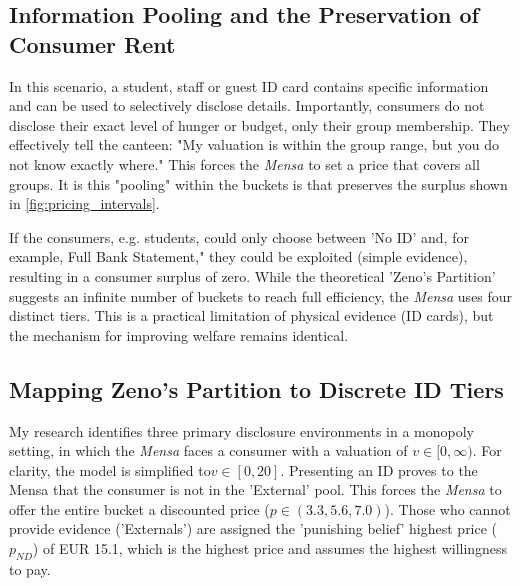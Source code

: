 \documentclass[12pt, a4paper]{article}
\begin{document}
\subsection{Information Pooling and the Preservation of Consumer Rent}
In this scenario, a student, staff or guest ID card contains specific information and can be used to selectively disclose details. Importantly, consumers do not disclose their exact level of hunger or budget, only their group membership. They effectively tell the canteen: "My valuation is within the group range, but you do not know exactly where." This forces the \textit{Mensa} to set a price that covers all groups. It is this "pooling" within the buckets is that preserves the surplus shown in \cref{fig:pricing_intervals}.

If the consumers, e.g. students, could only choose between 'No ID' and, for example, Full Bank Statement," they could be exploited (simple evidence), resulting in a consumer surplus of zero. While the theoretical 'Zeno's Partition' suggests an infinite number of buckets to reach full efficiency, the \textit{Mensa} uses four distinct tiers. This is a practical limitation of physical evidence (ID cards), but the mechanism for improving welfare remains identical.

\subsection{Mapping Zeno’s Partition to Discrete ID Tiers}
My research identifies three primary disclosure environments in a monopoly setting, in which the \textit{Mensa} faces a consumer with a valuation of $v \in [0, \infty)$. For clarity, the model is simplified to$v \in [0, 20]$.
Presenting an ID proves to the Mensa that the consumer is not in the 'External' pool. This forces the \textit{Mensa} to offer the entire bucket a discounted price  ($p \in(3.3, 5.6, 7.0)$). Those who cannot provide evidence ('Externals') are assigned the 'punishing belief' highest price ($p_{ND}$) of EUR 15.1, which is the highest price and assumes the highest willingness to pay.
\end{document}
